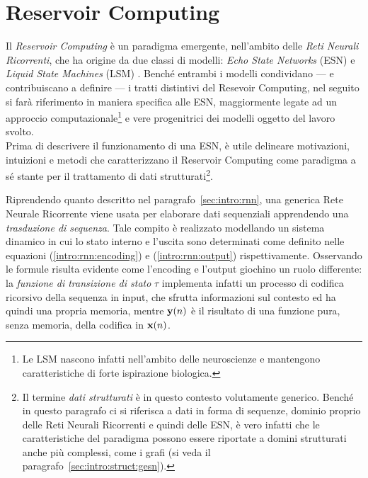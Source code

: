 
\section{Reservoir Computing}\label{sec:intro:rc}
Il \emph{Reservoir Computing} \cite{Lukosevicius:ESN-Survey,Verstraeten:AnExperimentalUnification,Jaeger:HarnessingNonlinearity} è un paradigma emergente, nell'ambito delle \emph{Reti Neurali Ricorrenti}, che ha origine da due classi di modelli: \emph{Echo State Networks} (ESN) \cite{Jaeger:EchoStateApproach} e \emph{Liquid State Machines} (LSM) \cite{Maas:LSM}.
Benché entrambi i modelli condividano --- e contribuiscano a definire --- i tratti distintivi del Resevoir Computing, nel seguito si farà riferimento in maniera specifica alle ESN, maggiormente legate ad un approccio computazionale\footnote{Le LSM nascono infatti nell'ambito delle neuroscienze e mantengono caratteristiche di forte ispirazione biologica.} e vere progenitrici dei modelli oggetto del lavoro svolto.\\
Prima di descrivere il funzionamento di una ESN, è utile delineare motivazioni, intuizioni e metodi che caratterizzano il Reservoir Computing come paradigma a sé stante per il trattamento di dati strutturati\footnote{Il termine \emph{dati strutturati} è in questo contesto volutamente generico. Benché in questo paragrafo ci si riferisca a dati in forma di sequenze, dominio proprio delle Reti Neurali Ricorrenti e quindi delle ESN, è vero infatti che le caratteristiche del paradigma possono essere riportate a domini strutturati anche più complessi, come i grafi (si veda il paragrafo~\vref{sec:intro:struct:gesn}).}.

Riprendendo quanto descritto nel paragrafo~\ref{sec:intro:rnn}, una generica Rete Neurale Ricorrente viene usata per elaborare dati sequenziali apprendendo una \emph{trasduzione di sequenza}. Tale compito è realizzato modellando un sistema dinamico in cui lo stato interno e l'uscita sono determinati come definito nelle equazioni (\ref{intro:rnn:encoding}) e (\ref{intro:rnn:output}) rispettivamente.
Osservando le formule risulta evidente come l'encoding e l'output giochino un ruolo differente: la \emph{funzione di transizione di stato} $\tau$ implementa infatti un processo di codifica ricorsivo della sequenza in input, che sfrutta informazioni sul contesto ed ha quindi una propria memoria, mentre $\mathbf{y}(n)$ è il risultato di una funzione pura, senza memoria, della codifica in $\mathbf{x}(n)$. 

